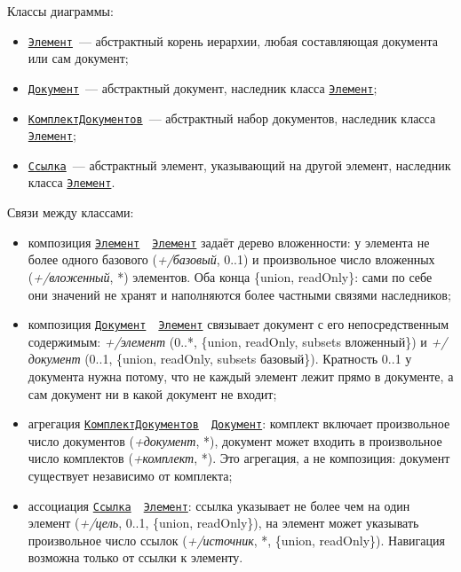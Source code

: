 Классы диаграммы:
\begin{itemize}
	\item \hyperref[fig:UMLroot]{\Verb|Элемент|}~--- абстрактный корень иерархии, любая составляющая документа или сам документ;
	\item \hyperref[fig:UMLroot]{\Verb|Документ|}~--- абстрактный документ, наследник класса \hyperref[fig:UMLroot]{\Verb|Элемент|};
	\item \hyperref[fig:UMLroot]{\Verb|КомплектДокументов|}~--- абстрактный набор документов, наследник класса \hyperref[fig:UMLroot]{\Verb|Элемент|};
	\item \hyperref[fig:UMLroot]{\Verb|Ссылка|}~--- абстрактный элемент, указывающий на другой элемент, наследник класса \hyperref[fig:UMLroot]{\Verb|Элемент|}.
\end{itemize}

Связи между классами:
\begin{itemize}
	\item композиция \hyperref[fig:UMLroot]{\Verb|Элемент|}~~\hyperref[fig:UMLroot]{\Verb|Элемент|} задаёт дерево вложенности: у элемента не более одного базового (\textit{+/базовый}, 0..1) и произвольное число вложенных (\textit{+/вложенный}, *) элементов. Оба конца \{union, readOnly\}: сами по себе они значений не хранят и наполняются более частными связями наследников;
	\item композиция \hyperref[fig:UMLroot]{\Verb|Документ|}~~\hyperref[fig:UMLroot]{\Verb|Элемент|} связывает документ с его непосредственным содержимым: \textit{+/элемент} (0..*, \{union, readOnly, subsets вложенный\}) и \textit{+/документ} (0..1, \{union, readOnly, subsets базовый\}). Кратность 0..1 у документа нужна потому, что не каждый элемент лежит прямо в документе, а сам документ ни в какой документ не входит;
	\item агрегация \hyperref[fig:UMLroot]{\Verb|КомплектДокументов|}~~\hyperref[fig:UMLroot]{\Verb|Документ|}: комплект включает произвольное число документов (\textit{+документ}, *), документ может входить в произвольное число комплектов (\textit{+комплект}, *). Это агрегация, а не композиция: документ существует независимо от комплекта;
	\item ассоциация \hyperref[fig:UMLroot]{\Verb|Ссылка|}~~\hyperref[fig:UMLroot]{\Verb|Элемент|}: ссылка указывает не более чем на один элемент (\textit{+/цель}, 0..1, \{union, readOnly\}), на элемент может указывать произвольное число ссылок (\textit{+/источник}, *, \{union, readOnly\}). Навигация возможна только от ссылки к элементу.
\end{itemize}

